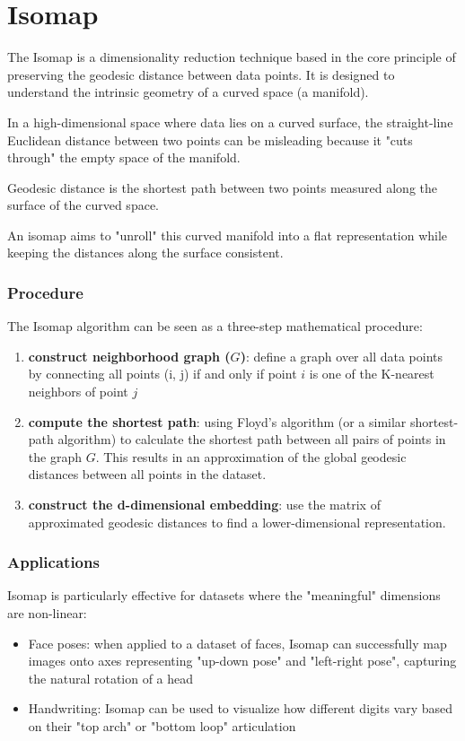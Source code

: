 \section{Isomap}
The Isomap is a dimensionality reduction technique based in the core principle of preserving the geodesic distance between data points. It is designed to understand the intrinsic geometry of a curved space (a manifold).\par
In a high-dimensional space where data lies on a curved surface, the straight-line Euclidean distance between two points can be misleading because it "cuts through" the empty space of the manifold.
\begin{definition}
    Geodesic distance is the shortest path between two points measured along the surface of the curved space.
\end{definition}
An isomap aims to "unroll" this curved manifold into a flat representation while keeping the distances along the surface consistent.

\subsubsection{Procedure}
The Isomap algorithm can be seen as a three-step mathematical procedure:
\begin{enumerate}[noitemsep]
    \item \textbf{construct neighborhood graph (\(G\))}: define a graph over all data points by connecting all points (i, j) if and only if point \(i\) is one of the K-nearest neighbors of point \(j\)
    \item \textbf{compute the shortest path}: using Floyd's algorithm (or a similar shortest-path algorithm) to calculate the shortest path between all pairs of points in the graph \(G\). This results in an approximation of the global geodesic distances between all points in the dataset.
    \item \textbf{construct the d-dimensional embedding}: use the matrix of approximated geodesic distances to find a lower-dimensional representation.
\end{enumerate}

\subsubsection{Applications}
Isomap is particularly effective for datasets where the "meaningful" dimensions are non-linear:
\begin{itemize}[noitemsep]
    \item Face poses: when applied to a dataset of faces, Isomap can successfully map images onto axes representing "up-down pose" and "left-right pose", capturing the natural rotation of a head
    \item Handwriting: Isomap can be used to visualize how different digits vary based on their "top arch" or "bottom loop" articulation
\end{itemize}

